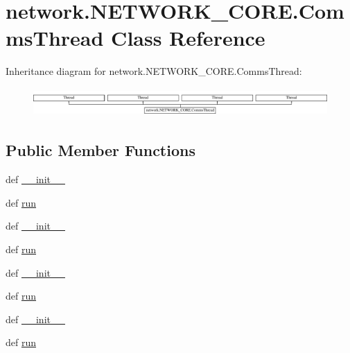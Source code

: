 \hypertarget{classnetwork_1_1NETWORK__CORE_1_1CommsThread}{}\section{network.\+N\+E\+T\+W\+O\+R\+K\+\_\+\+C\+O\+R\+E.\+Comms\+Thread Class Reference}
\label{classnetwork_1_1NETWORK__CORE_1_1CommsThread}
Inheritance diagram for network.\+N\+E\+T\+W\+O\+R\+K\+\_\+\+C\+O\+R\+E.\+Comms\+Thread\+:\begin{figure}[H]
\begin{center}
\leavevmode
\includegraphics[height=1.098039cm]{classnetwork_1_1NETWORK__CORE_1_1CommsThread}
\end{center}
\end{figure}
\subsection*{Public Member Functions}
\begin{DoxyCompactItemize}
\item 
def \hyperlink{classnetwork_1_1NETWORK__CORE_1_1CommsThread_ab3b9b67bc77d6ed6d5575e97d6031ac6}{\+\_\+\+\_\+init\+\_\+\+\_\+}
\item 
def \hyperlink{classnetwork_1_1NETWORK__CORE_1_1CommsThread_a3d9c7b5081b08434f9c0c70665ebc5f4}{run}
\item 
def \hyperlink{classnetwork_1_1NETWORK__CORE_1_1CommsThread_ab3b9b67bc77d6ed6d5575e97d6031ac6}{\+\_\+\+\_\+init\+\_\+\+\_\+}
\item 
def \hyperlink{classnetwork_1_1NETWORK__CORE_1_1CommsThread_a3d9c7b5081b08434f9c0c70665ebc5f4}{run}
\item 
def \hyperlink{classnetwork_1_1NETWORK__CORE_1_1CommsThread_ab3b9b67bc77d6ed6d5575e97d6031ac6}{\+\_\+\+\_\+init\+\_\+\+\_\+}
\item 
def \hyperlink{classnetwork_1_1NETWORK__CORE_1_1CommsThread_a3d9c7b5081b08434f9c0c70665ebc5f4}{run}
\item 
def \hyperlink{classnetwork_1_1NETWORK__CORE_1_1CommsThread_ab3b9b67bc77d6ed6d5575e97d6031ac6}{\+\_\+\+\_\+init\+\_\+\+\_\+}
\item 
def \hyperlink{classnetwork_1_1NETWORK__CORE_1_1CommsThread_a3d9c7b5081b08434f9c0c70665ebc5f4}{run}
\end{DoxyCompactItemize}
